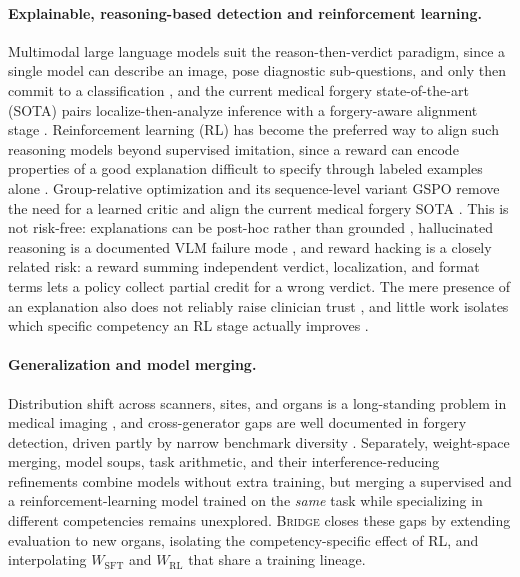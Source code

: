 \documentclass[10pt,twocolumn,letterpaper]{article}
\newcommand{\bridge}{\textsc{Bridge}}
\begin{document}
\paragraph{Explainable, reasoning-based detection and reinforcement learning.} Multimodal large language models suit the reason-then-verdict paradigm, since a single model can describe an image, pose diagnostic sub-questions, and only then commit to a classification \cite{qwenvl2024, qwen3vl2025}, and the current medical forgery state-of-the-art (SOTA) pairs localize-then-analyze inference with a forgery-aware alignment stage \cite{medforge2026}. Reinforcement learning (RL) has become the preferred way to align such reasoning models beyond supervised imitation, since a reward can encode properties of a good explanation difficult to specify through labeled examples alone \cite{ppo2017, grpo2024, rlhf_instructgpt_2022, chain_of_thought_2022}. Group-relative optimization and its sequence-level variant GSPO remove the need for a learned critic and align the current medical forgery SOTA \cite{grpo2024, gspo2025, medvlmr1_2025}. This is not risk-free: explanations can be post-hoc rather than grounded \cite{seeingbeforereasoning2025, vigil2026}, hallucinated reasoning is a documented VLM failure mode \cite{hallucination_vlm_2024, radiology_report_vlm_2023, medical_grounding_vlm_2024}, and reward hacking \cite{rewardhacking2026} is a closely related risk: a reward summing independent verdict, localization, and format terms lets a policy collect partial credit for a wrong verdict. The mere presence of an explanation also does not reliably raise clinician trust \cite{explainable_medical_ai_2025, clinical_trust_ai_2024}, and little work isolates which specific competency an RL stage actually improves \cite{reasoning_rl_visual_2024}.

\paragraph{Generalization and model merging.} Distribution shift across scanners, sites, and organs is a long-standing problem in medical imaging \cite{scanner_variability_2024, medical_domain_shift_2024, ood_generalization_survey_2024, domain_adaptation_medical_2023, federated_learning_medical_2023}, and cross-generator gaps are well documented in forgery detection, driven partly by narrow benchmark diversity \cite{fmsd2026, benchmark_diversity_2025, medical_benchmark_survey_2026, cross_organ_transfer_2024}. Separately, weight-space merging, model soups, task arithmetic, and their interference-reducing refinements \cite{modelsoups2022, task_arithmetic_2023, ties_merging_2023, dare_merging_2024, lorainterference2025, lora_orthogonal_merge_2025, modelinterp2025} combine models without extra training, but merging a supervised and a reinforcement-learning model trained on the \emph{same} task while specializing in different competencies remains unexplored. \bridge{} closes these gaps by extending evaluation to new organs, isolating the competency-specific effect of RL, and interpolating $W_{\mathrm{SFT}}$ and $W_{\mathrm{RL}}$ that share a training lineage.
\end{document}
